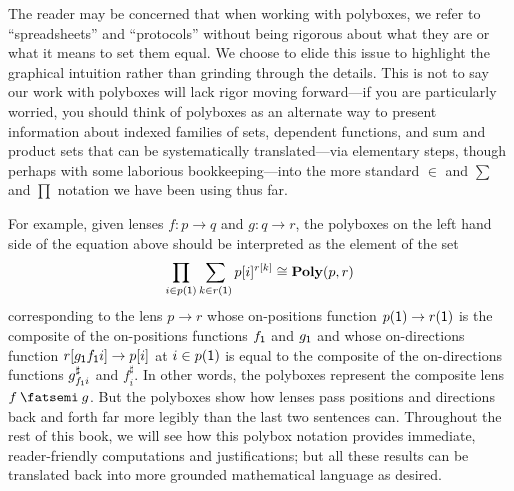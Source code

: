 \documentclass[Book-Poly]{subfiles}
\begin{document}
\begin{remark}
  The reader may be concerned that when working with polyboxes, we refer to ``spreadsheets'' and ``protocols'' without being rigorous about what they are or what it means to set them equal.
  We choose to elide this issue to highlight the graphical intuition rather than grinding through the details.
  This is not to say our work with polyboxes will lack rigor moving forward---if you are particularly worried, you should think of polyboxes as an alternate way to present information about indexed families of sets, dependent functions, and sum and product sets that can be systematically translated---via elementary steps, though perhaps with some laborious bookkeeping---into the more standard $\in$ and $\sum$ and $\prod$ notation we have been using thus far.

  For example, given lenses $f\colon p\to q$ and $g\colon q\to r$, the polyboxes on the left hand side of the equation above should be interpreted as the element of the set
  \[
    \prod_{i\in p(\textsf{1})}\sum_{k\in r(\textsf{1})}p[i]^{r[k]}\cong\mathbf{Poly}(p,r)
  \]
  corresponding to the lens $p\to r$ whose on-positions function $p(\textsf{1})\to r(\textsf{1})$ is the composite of the on-positions functions $f_{\textsf{1}}$ and $g_{\textsf{1}}$ and whose on-directions function $r[g_{\textsf{1}}f_{\textsf{1}}i]\to p[i]$ at $i\in p(\textsf{1})$ is equal to the composite of the on-directions functions $g^\sharp_{f_{\textsf{1}}i}$ and $f^\sharp_i$.
  In other words, the polyboxes represent the composite lens $f\then g$.
  But the polyboxes show how lenses pass positions and directions back and forth far more legibly than the last two sentences can.
  Throughout the rest of this book, we will see how this polybox notation provides immediate, reader-friendly computations and justifications; but all these results can be translated back into more grounded mathematical language as desired.
\end{remark}
\end{document}
